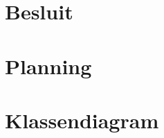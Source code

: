 \documentclass[eind]{Setup/penoverslag}
\begin{document}
\section*{Besluit}
\label{sec: Besluit}






\newpage
\appendix
\section{Planning}
\label{app: Planning}


\section{Klassendiagram}
\label{app: Klassendiagram}


% 
% 
% 
\end{document}
